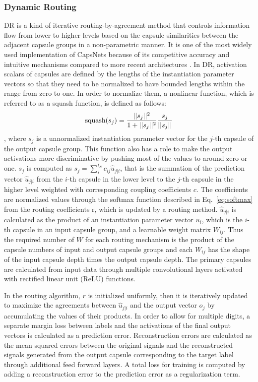 \documentclass[review]{elsarticle}
\begin{document}
\subsubsection{Dynamic Routing}
DR \citep{DBLP:conf/nips/SabourFH17} is a kind of iterative routing-by-agreement method that controls information flow from lower to higher levels based on the capsule similarities between the adjacent capsule groups in a non-parametric manner.
It is one of the most widely used implementation of CapsNets because of its competitive accuracy and intuitive mechanisms compared to more recent architectures  \citep{DBLP:conf/nips/HahnPK19, Malmgren1314210}.
In DR, activation scalars of capsules are defined by the lengths of the instantiation parameter vectors so that they need to be normalized to have bounded lengths within the range from zero to one.
In order to normalize them, a nonlinear function, which is referred to as a squash function, is defined as follows:
\begin{equation}
\text{squash}(s_j) = {{||s_j||^2} \over{1+||s_j||^2}} {{s_j}\over{||s_j||}}
\label{eq:squash}
\end{equation}
, where $s_j$ is a unnormalized instantiation parameter vector for the $j$-th capsule of the output capsule group.
This function also has a role to make the output activations more discriminative by pushing most of the values to around zero or one.
$s_j$ is computed as $s_j = \sum^{l_N}_i c_{ij} \hat{u}_{j|i}$, that is the summation of the prediction vector $\hat{u}_{j|i}$ from the $i$-th capsule in the lower level to the $j$-th capsule in the higher level weighted with corresponding coupling coefficients $c$.
The coefficients are normalized values through the softmax function described in Eq.~\ref{eq:softmax} from the routing coefficients r, which is updated by a routing method.
$\hat{u}_{j|i}$ is calculated as the product of an instantiation parameter vector $u_i$, which is the $i$-th capsule in an input capsule group, and a learnable weight matrix $W_{ij}$.
Thus the required number of $W$ for each routing mechanism is the product of the capsule numbers of input and output capsule groups and each $W_{ij}$ has the shape of the input capsule depth times the output capsule depth.
The primary capsules are calculated from input data through multiple convolutional layers activated with rectified linear unit (ReLU) functions.

In the routing algorithm, $r$ is initialized uniformly, then it is iteratively updated to maximize the agreements between $\hat{u}_{j|i}$ and the output vector $o_j$ by accumulating the values of their products.
In order to allow for multiple digits, a separate margin loss between labels and the activations of the final output vectors is calculated as a prediction error.
Reconstruction errors are calculated as the mean squared errors between the original signals and the reconstructed signals generated from the output capsule corresponding to the target label through additional feed forward layers.
A total loss for training is computed by adding a reconstruction error to the prediction error as a regularization term.
\end{document}
